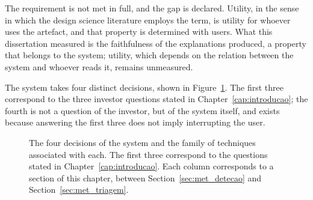 The requirement is not met in full, and the gap is declared. Utility, in the sense in which the
design science literature employs the term, is utility for whoever uses the artefact, and that
property is determined with users. What this dissertation measured is the faithfulness of the
explanations produced, a property that belongs to the system; utility, which depends on the
relation between the system and whoever reads it, remains unmeasured.

The system takes four distinct decisions, shown in Figure~\ref{fig:met_decisoes}. The first three
correspond to the three investor questions stated in Chapter~\ref{cap:introducao}; the fourth is
not a question of the investor, but of the system itself, and exists because answering the first
three does not imply interrupting the user.

\begin{figure}[htbp]
\centering
{}
\caption[The four decisions of the system]{The four decisions of the system and the family of
techniques associated with each. The first three correspond to the questions stated in
Chapter~\ref{cap:introducao}. Each column corresponds to a section of this chapter, between
Section~\ref{sec:met_detecao} and Section~\ref{sec:met_triagem}.}
\label{fig:met_decisoes}
\end{figure}


